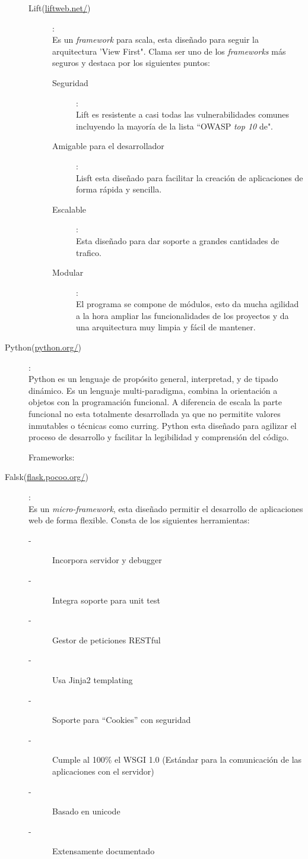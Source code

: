 \documentclass[12pt]{article} %
\begin{document}
\begin{description}
\begin{description}
\item[Lift(\url{liftweb.net/})]:
\\Es un \textit{framework} para scala, esta diseñado para seguir la arquitectura 'View First". Clama ser uno de los \textit{frameworks} más seguros y destaca por los siguientes puntos:
\begin{description}
\item[Seguridad]: \\Lift es resistente a casi todas las vulnerabilidades comunes incluyendo la mayoría de la lista ``OWASP \textit{top 10} de".
\item[Amigable para el desarrollador]: \\Lisft esta diseñado para facilitar la creación de aplicaciones de forma rápida y sencilla.
\item[Escalable]: \\Esta diseñado para dar soporte a grandes cantidades de trafico.
\item[Modular]: \\El programa se compone de módulos, esto da mucha agilidad a la hora ampliar las funcionalidades de los proyectos y da una arquitectura muy limpia y fácil de mantener.
\end{description}
\end{description}

\item[Python(\url{python.org/})]:
\\Python es un lenguaje de propósito general, interpretad, y de tipado dinámico. Es un lenguaje multi-paradigma, combina la orientación a objetos con la programación funcional. A diferencia de escala la parte funcional no esta totalmente desarrollada ya que no permitite valores inmutables o técnicas como curring. Python esta diseñado para agilizar el proceso de desarrollo y facilitar la legibilidad y comprensión del código.

Frameworks:
\item[Falsk(\url{flask.pocoo.org/})]:
\\Es un \textit{micro-framework}, esta diseñado permitir el desarrollo de aplicaciones web de forma flexible. Consta de los siguientes herramientas:
\begin{description}
\item[-]Incorpora servidor y debugger
\item[-]Integra soporte para unit test
\item[-]Gestor de peticiones RESTful
\item[-]Usa Jinja2 templating
\item[-]Soporte para ``Cookies'' con seguridad
\item[-]Cumple al 100\% el WSGI 1.0 (Estándar para la comunicación de las aplicaciones con el servidor) 
\item[-]Basado en unicode
\item[-]Extensamente documentado
\end{description}


\end{description}
\end{document}
